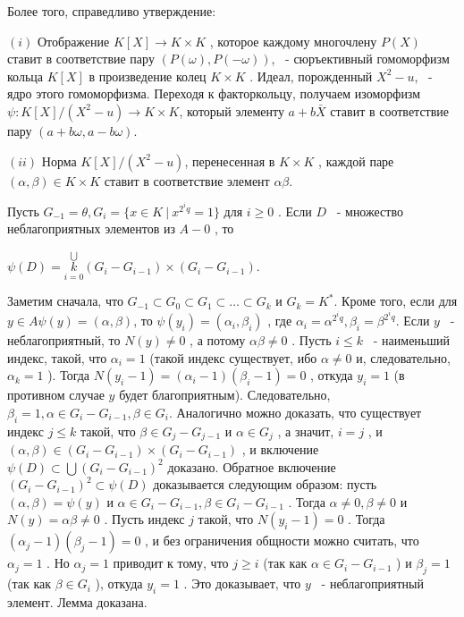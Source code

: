 Более того, справедливо утверждение:

\begin{lemma}

$(i)$
 Отображение $K[X]\rightarrow K\times K$
 , которое каждому многочлену $P(X)$
 ставит в соответствие пару $(P(\omega),P(-\omega))$,
 ~- сюръективный гомоморфизм кольца $K[X]$
 в произведение колец $K\times K$
 . Идеал, порожденный $X^2 - u$, ~- ядро этого гомоморфизма. Переходя к факторкольцу, получаем изоморфизм $\psi : K[X]/(X^2 -u)\rightarrow K\times K$, который элементу $a+b\bar X$
 ставит в соответствие пару $(a+b\omega, a - b\omega)$.

$(ii)$ Норма $K[X]/(X^2 - u)$, перенесенная в $K\times K$
, каждой паре $(\alpha,\beta) \in K\times K$
 ставит в соответствие элемент $\alpha\beta$.
\end{lemma}
\newpage

\begin{lemma}

Пусть $G_{-1}=\theta, G_i = \{x \in K \ | \ x^{2^iq} = 1\}$
 для $i\geqslant 0$
 . Если $D$
 ~- множество неблагоприятных элементов из $A - {0}$
 , то 
\end{lemma}
\begin{center}
$\psi(D) = \underset{i=0}{\overset{\bigcup}{k}}(G_i - G_{i-1})\times (G_i - G_{i-1})$.
\end{center}



\begin{myproof}
Заметим сначала, что $G_{-1}\subset G_0 \subset G_1 \subset \dots\subset G_k$ и $G_k = K^*$. Кроме того, если для $y \in A \psi(y) = (\alpha,\beta)$, то $\psi(y_i)=(\alpha_i,\beta_i)$
, где $\alpha_i = \alpha^{2^iq}, \beta_i = \beta^{2^iq}$.
Если $y$
 ~- неблагоприятный, то $N(y)\not= 0$
 , а потому $\alpha\beta\not= 0$
. Пусть $i\leqslant k$
 ~- наименьший индекс, такой, что $\alpha_i = 1$
 (такой индекс существует, ибо $\alpha\not= 0$
 и, следовательно, $\alpha_k = 1$
 ). Тогда $N(y_i-1) = (\alpha_i-1)(\beta_i - 1)=0$
 , откуда $y_i = 1$
 (в противном случае $y$
 будет благоприятным). Следовательно, $\beta_i = 1, \alpha \in G_i - G_{i-1}, \beta\in G_i$. Аналогично можно доказать, что существует индекс $j\leqslant k$
 такой, что $\beta\in G_j-G_{j-1}$
 и $\alpha\in G_j$
 , а значит, $i=j$
, и $(\alpha,\beta)\in (G_i-G_{i-1})\times(G_i-G_{i-1})$
, и включение $\psi(D)\subset\bigcup(G_i-G_{i-1})^2$
 доказано.
Обратное включение $(G_i-G_{i-1})^2\subset\psi(D)$
 доказывается следующим образом: пусть $(\alpha,\beta)=\psi(y)$
 и $\alpha\in G_i-G_{i-1}, \beta\in G_i-G_{i-1}$
 . Тогда $\alpha\not= 0, \beta\not= 0$
 и $N(y) = \alpha\beta\not= 0$
 . Пусть индекс $j$
 такой, что $N(y_i-1)=0$
 . Тогда $(\alpha_j-1)(\beta_j-1)=0$
, и без ограничения общности можно считать, что $\alpha_j = 1$
. Но $\alpha_j =1$
 приводит к тому, что $j\geqslant i$
 (так как $\alpha\in G_i - G_{i-1}$
    ) и $\beta_j = 1$
 (так как $\beta\in G_i$
    ), откуда $y_i = 1$
. Это доказывает, что $y$
 ~- неблагоприятный элемент. Лемма доказана.
\end{myproof}


